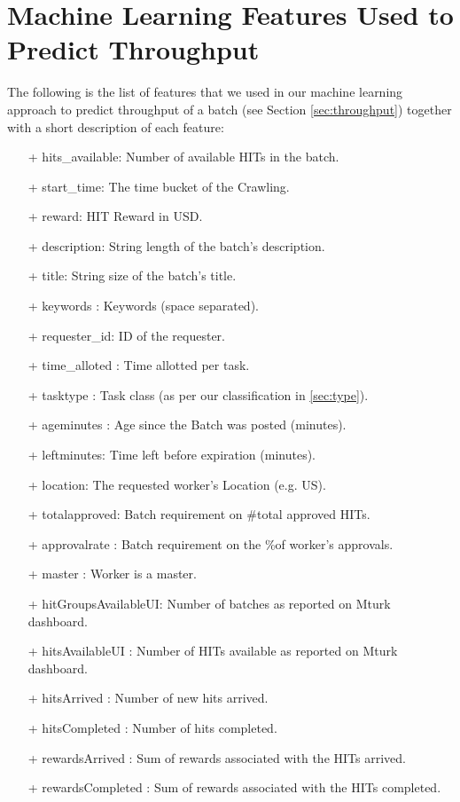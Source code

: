 \appendix
\label{ap:feats}
\section{Machine Learning Features Used to Predict Throughput}
The following is the list of features that we used in our machine learning approach to predict throughput of a batch (see Section \ref{sec:throughput}) together with a short description of each feature:
\begin{itemize}[noitemsep,topsep=0pt,parsep=0pt,partopsep=0pt]
\item[+] hits\_available:  Number of available HITs in the batch.
\item[+] start\_time:  The time bucket of the Crawling.
\item[+] reward: HIT Reward in USD.
\item[+] description:  String length of the batch's description.
\item[+] title: String size of the batch's title.
\item[+] keywords : Keywords (space separated).
\item[+] requester\_id:   ID of the requester.
\item[+] time\_alloted : Time allotted per task.
\item[+] tasktype : Task class (as per our classification in \ref{sec:type}).
\item[+] ageminutes : Age since the Batch was posted (minutes).
\item[+] leftminutes: Time left before expiration (minutes).
\item[+] location: The requested worker's Location (e.g. US).
\item[+] totalapproved: Batch requirement on \#total approved HITs.
\item[+] approvalrate : Batch requirement on the \%of worker's approvals.
\item[+] master : Worker is a master.
\item[+] hitGroupsAvailableUI: Number of batches as reported on Mturk dashboard.
\item[+] hitsAvailableUI : Number of HITs available as reported on Mturk dashboard.
\item[+] hitsArrived : Number of new hits arrived.
\item[+] hitsCompleted : Number of hits completed.
\item[+] rewardsArrived : Sum of rewards associated with the HITs arrived.
\item[+] rewardsCompleted : Sum of rewards associated with the HITs completed.

\end{itemize}
